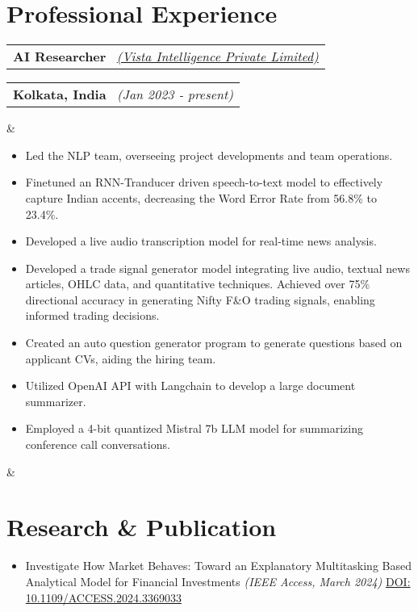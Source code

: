 \documentclass[11pt,a4paper,sans]{moderncv}
\makeatletter
\newcommand*{\customcventry}[7][.13em]{
\begin{tabular}{@{}l}
{\bfseries #4} \
{\itshape #3}
\end{tabular}
\hfill
\begin{tabular}{l@{}}
{\bfseries #5} \
{\itshape #2}
\end{tabular}
\ifx&#7&%
\else{\
\begin{minipage}{\maincolumnwidth}%
\small#7%
\end{minipage}}\fi%
\par\addvspace{#1}}
\makeatother
\begin{document}
\section{Professional Experience}
\customcventry{(Jan 2023 ‐ present)}{{\color{blue}\href{https://feedsense.vistaintelligence.ai/}{(Vista Intelligence Private Limited)}}}{AI Researcher}{Kolkata, 
India}{}{
{\begin{itemize}[leftmargin=0.6cm, label={\textbullet}]
\item Led the NLP team, overseeing project developments and team operations.
\item Finetuned an RNN-Tranducer driven speech-to-text model to effectively capture Indian accents, decreasing the Word Error Rate from 56.8\% to 23.4\%.
\item Developed a live audio transcription model for real-time news analysis.
\item Developed a trade signal generator model integrating live audio, textual news articles, OHLC data, and quantitative techniques. Achieved over 75\% directional accuracy in generating Nifty F\&O trading signals, enabling informed trading decisions.
\item Created an auto question generator program to generate questions based on applicant CVs, aiding the hiring team.
\item Utilized OpenAI API with Langchain to develop a large document summarizer.
\item Employed a 4-bit quantized Mistral 7b LLM model for summarizing conference call conversations.
\end{itemize}}}


\section{Research \& Publication}
{\begin{itemize}[label=\textbullet]
    \item Investigate How Market Behaves: Toward an Explanatory Multitasking Based Analytical Model for Financial Investments \textit{(IEEE Access, March 2024)} \color{blue}\href{DOI: 10.1109/ACCESS.2024.3369033}{DOI: 10.1109/ACCESS.2024.3369033}
\end{itemize}}
\end{document}
